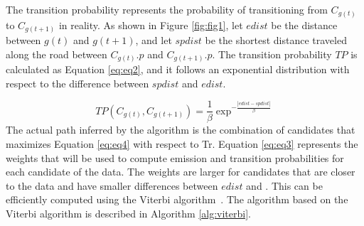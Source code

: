 \documentclass[preprint,12pt]{elsarticle}
\begin{document}
The transition probability represents the probability of transitioning from $C_{g(t)}$ to $C_{g(t+1)}$ in reality. As shown in Figure \ref{fig:fig1}, let $edist$ be the distance between $g(t)$ and $g(t+1)$, and let $spdist$ be the shortest distance traveled along the road between $C_{g(t)}.p$ and $C_{g(t+1)}.p$. The transition probability $TP$ is calculated as Equation \ref{eq:eq2}, and it follows an exponential distribution with respect to the difference between $spdist$ and $edist$.

\begin{equation}\label{eq:eq2}
	TP(C_{g(t)},C_{g(t+1)}) = \frac{1}{\beta }\exp ^{-\frac{\left|edist - spdist \right|}{\beta}}
\end{equation}
The actual path inferred by the algorithm is the combination of candidates that maximizes Equation \ref{eq:eq4} with respect to Tr.
Equation \ref{eq:eq3} represents the weights that will be used to compute emission and transition probabilities for each candidate of the data. The weights are larger for candidates that are closer to the data and have smaller differences between $edist$ and $\label{spdist}$. This can be efficiently computed using the Viterbi algorithm~\cite{forney1973viterbi}.
The algorithm based on the Viterbi algorithm is described in Algorithm \ref{alg:viterbi}.
\end{document}
